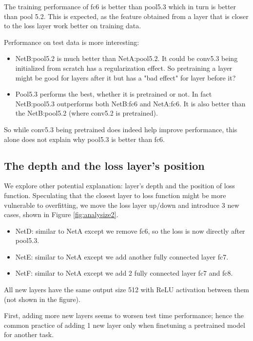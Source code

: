 \documentclass[10pt,twocolumn,letterpaper]{article}
\begin{document}
The training performance of fc6 is better than pool5.3 which in turn is better than pool 5.2. This is expected, as the feature obtained from a layer that is closer to the loss layer work better on training data.




Performance on test data is more interesting:
\begin{itemize}
  \item NetB:pool5.2 is much better than NetA:pool5.2. It could be conv5.3 being initialized from scratch has a regularization effect. So pretraining a layer might be good for layers after it but has a "bad effect" for layer before it?
  \item Pool5.3 performs the best, whether it is pretrained or not. In fact NetB:pool5.3 outperforms both NetB:fc6 and NetA:fc6. It is also better than the NetB:pool5.2 (where conv5.2 is pretrained).
\end{itemize}

So while conv5.3 being pretrained does indeed help improve performance, this alone does not explain why pool5.3 is better than fc6.



\subsection{The depth and the loss layer's position}


We explore other potential explanation: layer's depth and the position of loss function. Speculating that the closest layer to loss function might be more vulnerable to overfitting, we move the loss layer up/down and introduce 3 new cases, shown in Figure \ref{fig:analysize2}.
\begin{itemize}
  \item NetD: similar to NetA except we remove fc6, so the loss is now directly after pool5.3.
  \item NetE: similar to NetA except we add another fully connected layer fc7.
  \item NetF: similar to NetA except we add 2 fully connected layer fc7 and fc8.
\end{itemize}

All new layers have the same output size 512 with ReLU activation between them (not shown in the figure).

First, adding more new layers seems to worsen test time performance; hence the common practice of adding 1 new layer only when finetuning a pretrained model for another task.
\end{document}
